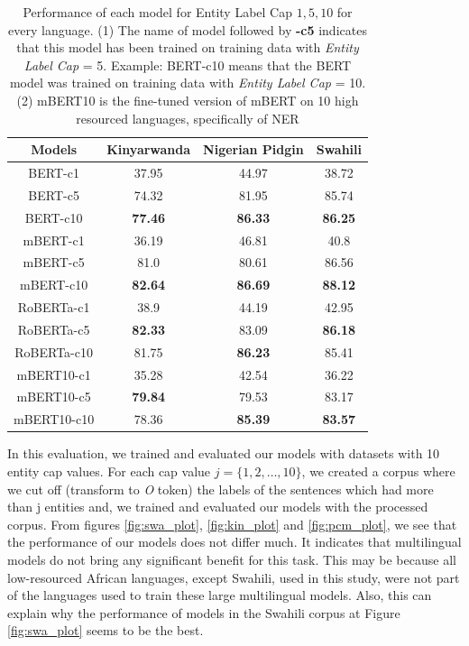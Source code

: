 \documentclass[11pt,a4paper]{article}
\begin{document}
\begin{table}
\small
    \centering
	\label{UNET_and_GMM}
	\begin{tabular}{cccc}
	    \toprule
        Models       & Kinyarwanda     & Nigerian Pidgin  & Swahili \\  \midrule
        BERT-c1      & 37.95           & 44.97            & 38.72        \\ 
        BERT-c5      & 74.32           & 81.95            & 85.74         \\ 
        BERT-c10     & \textbf{77.46}  & \textbf{86.33}   & \textbf{86.25} \\ \midrule
        mBERT-c1     & 36.19           & 46.81            & 40.8            \\   
        mBERT-c5     & 81.0            & 80.61            & 86.56            \\ 
        mBERT-c10    & \textbf{82.64}  & \textbf{86.69}   & \textbf{88.12}    \\ \midrule
        RoBERTa-c1   & 38.9            & 44.19            & 42.95            \\ 
        RoBERTa-c5   & \textbf{82.33}  & 83.09            & \textbf{86.18}  \\ 
        RoBERTa-c10  & 81.75           & \textbf{86.23}   & 85.41  \\ \midrule
        mBERT10-c1   & 35.28           & 42.54            & 36.22  \\ 
        mBERT10-c5   & \textbf{79.84}  & 79.53            & 83.17  \\ 
        mBERT10-c10  & 78.36           & \textbf{85.39}   & \textbf{83.57} \\
        \bottomrule
	\end{tabular}
	\caption{Performance of each model for Entity Label Cap ${1, 5, 10}$ for every language. (1) The name of model followed by \textbf{-c5} indicates that this model has been trained on training data with \textit{Entity Label Cap} = 5. Example: BERT-c10 means that the BERT model was trained on training data with \textit{Entity Label Cap} = 10. (2) mBERT10 is the fine-tuned version of mBERT on 10 high resourced languages, specifically of NER}
\end{table}

In this evaluation, we trained and evaluated our models with datasets with 10 entity cap values. For each cap value $j = \{1,2, \dots, 10\}$, we created a corpus where we cut off (transform to \textit{O} token) the labels of the sentences which had more than j entities and, we trained and evaluated our models with the processed corpus. From figures \ref{fig:swa_plot}, \ref{fig:kin_plot} and \ref{fig:pcm_plot}, we see that the performance of our models does not differ much. It indicates that multilingual models do not bring any significant benefit for this task. This may be because all low-resourced African languages, except Swahili, used in this study, were not part of the languages used to train these large multilingual models. Also, this can explain why the performance of models in the Swahili corpus at Figure \ref{fig:swa_plot} seems to be the best.
\end{document}
